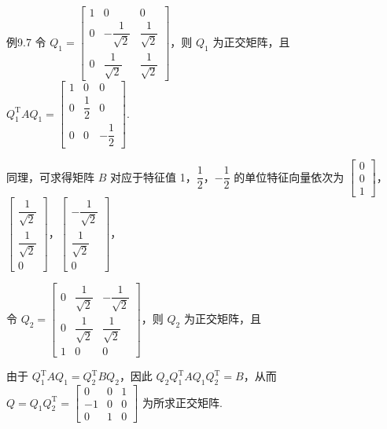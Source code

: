 \begin{fcard}{例9.7}
令 $Q_1=\begin{bmatrix}1&0&0\\[4pt]0&-\dfrac{1}{\sqrt2}&\dfrac{1}{\sqrt2}\\[8pt]0&\dfrac{1}{\sqrt2}&\dfrac{1}{\sqrt2}\end{bmatrix}$，则 $Q_1$ 为正交矩阵，且 $Q_1^{\mathrm T}AQ_1=\begin{bmatrix}1&0&0\\[4pt]0&\dfrac12&0\\[4pt]0&0&-\dfrac12\end{bmatrix}$.


同理，可求得矩阵 $B$ 对应于特征值 1，$\dfrac12$，$-\dfrac12$ 的单位特征向量依次为 $\begin{bmatrix}0\\0\\1\end{bmatrix}$，$\begin{bmatrix}\dfrac{1}{\sqrt2}\\[6pt]\dfrac{1}{\sqrt2}\\[6pt]0\end{bmatrix}$，$\begin{bmatrix}-\dfrac{1}{\sqrt2}\\[6pt]\dfrac{1}{\sqrt2}\\[6pt]0\end{bmatrix}$，

令 $Q_2=\begin{bmatrix}0&\dfrac{1}{\sqrt2}&-\dfrac{1}{\sqrt2}\\[8pt]0&\dfrac{1}{\sqrt2}&\dfrac{1}{\sqrt2}\\[8pt]1&0&0\end{bmatrix}$，则 $Q_2$ 为正交矩阵，且



由于 $Q_1^{\mathrm T}AQ_1=Q_2^{\mathrm T}BQ_2$，因此 $Q_2Q_1^{\mathrm T}AQ_1Q_2^{\mathrm T}=B$，从而 $Q=Q_1Q_2^{\mathrm T}=\begin{bmatrix}0&0&1\\-1&0&0\\0&1&0\end{bmatrix}$ 为所求正交矩阵.
\end{fcard}

